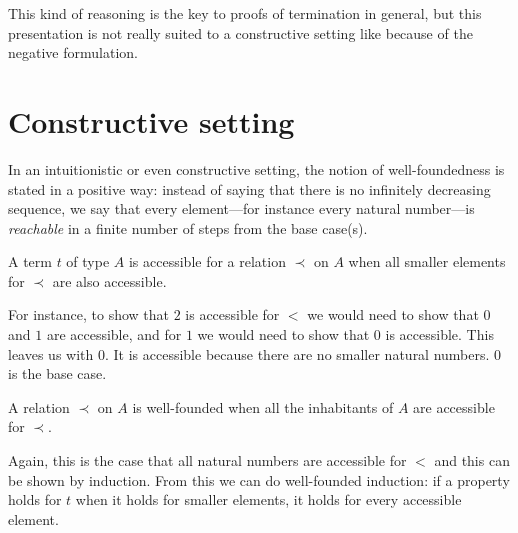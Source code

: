 This kind of reasoning is the key to proofs of termination in general, but this
presentation is not really suited to a constructive setting like \Coq because of
the negative formulation.

\section{Constructive setting}

In an intuitionistic or even constructive setting, the notion of
well-foundedness is stated in a positive way: instead of saying that there is no
infinitely decreasing sequence, we say that every element---for instance every
natural number---is \emph{reachable} in a finite number of steps from the base
case(s).

\begin{definition}[Accessibility]
  A term \(t\) of type \(A\) is accessible for a relation \(\prec\) on \(A\)
  when all smaller elements for \(\prec\) are also accessible.
\end{definition}

For instance, to show that \(2\) is accessible for \(<\) we would need to show
that \(0\) and \(1\) are accessible, and for \(1\) we would need to show that
\(0\) is accessible. This leaves us with \(0\). It is accessible because there
are no smaller natural numbers. \(0\) is the base case.

\begin{definition}
  A relation \(\prec\) on \(A\) is well-founded when all the inhabitants of
  \(A\) are accessible for \(\prec\).
\end{definition}

Again, this is the case that all natural numbers are accessible for \(<\)
and this can be shown by induction.
From this we can do well-founded induction: if a property holds for \(t\) when
it holds for smaller elements, it holds for every accessible element.

